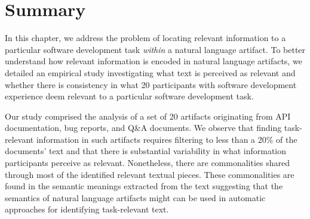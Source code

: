 \section{Summary}
\label{cp3:summary}



In this chapter, we address the problem of locating relevant information
to a particular software development task \textit{within} a natural language artifact.
To better understand how relevant information is encoded in natural language artifacts,
we detailed an empirical study investigating what text is perceived as relevant
and whether there is consistency in what 20 participants with software development experience deem relevant
to a particular software development task.


Our study comprised the analysis of a set of 20 artifacts originating from API documentation, bug reports, and Q\&A documents.
We observe that finding task-relevant information in such artifacts requires filtering to less than
a 20\% of the documents' text and that there is substantial variability in what information participants perceive as relevant.
Nonetheless, there are commonalities shared through most of the identified relevant textual pieces.
These commonalities are found in the semantic meanings extracted from the text suggesting that
the semantics of natural language artifacts might 
can be used in automatic approaches for identifying task-relevant text.
